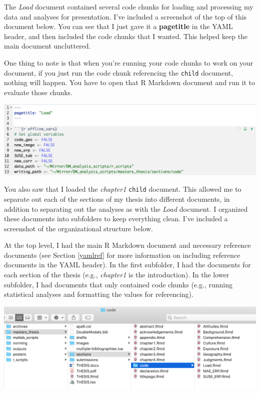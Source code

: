 \documentclass[
]{book}
\begin{document}
The \emph{Load} document contained several code chunks for loading and processing my data and analyses for presentation. I've included a screenshot of the top of this document below. You can see that I just gave it a \textbf{pagetitle} in the YAML header, and then included the code chunks that I wanted. This helped keep the main document uncluttered.

One thing to note is that when you're running your code chunks to work on your document, if you just run the code chunk referencing the \texttt{child} document, nothing will happen. You have to open that R Markdown document and run it to evaluate those chunks.

\includegraphics[width=22.36in]{images/content_child_setup}

You also saw that I loaded the \emph{chapter1} \texttt{child} document. This allowed me to separate out each of the sections of my thesis into different documents, in addition to separating out the analyses as with the \emph{Load} document. I organized these documents into subfolders to keep everything clean. I've included a screenshot of the organizational structure below.

At the top level, I had the main R Markdown document and necessary reference documents (see Section \ref{yamlref} for more information on including reference documents in the YAML header). In the first subfolder, I had the documents for each section of the thesis (e.g., \emph{chapter1} is the introduction). In the lower subfolder, I had documents that only contained code chunks (e.g., running statistical analyses and formatting the values for referencing).

\includegraphics[width=22.64in]{images/content_organization}
\end{document}
